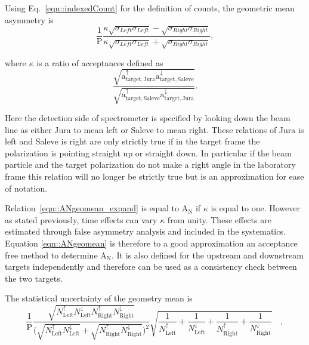 Using Eq.~\ref{eqn::indexedCount} for the definition of counts, the geometric
mean asymmetry is
\begin{equation}
  \label{eqn::ANgeomean_expand}
\frac{1}{\mathrm{P}}\frac{\kappa \sqrt{\sigma_{Left}\sigma_{Left}} -
  \sqrt{\sigma_{Right}\sigma_{Right}}}{\kappa \sqrt{\sigma_{Left}\sigma_{Left}}
  + \sqrt{\sigma_{Right}\sigma_{Right}}},
\end{equation}

\noindent
where $\kappa$ is a ratio of acceptances defined as
\begin{equation}
\frac{\sqrt{\mathrm{a}^{\uparrow}_{\mathrm{target,Jura}}
    \mathrm{a}^{\downarrow}_{\mathrm{target,Saleve}}}}
     {\sqrt{\mathrm{a}^{\uparrow}_{\mathrm{target,Saleve}}
         \mathrm{a}^{\downarrow}_{\mathrm{target,Jura}}}}.
     \label{equ::accGeoMean}
\end{equation}

\noindent
Here the detection side of spectrometer is specified by looking down the beam
line as either Jura to mean left or Saleve to mean right.  These relations of
Jura is left and Saleve is right are only strictly true if in the target frame
the polarization is pointing straight up or straight down.  In particular if the
beam particle and the target polarization do not make a right angle in the
laboratory frame this relation will no longer be strictly true but is an
approximation for ease of notation.

Relation~\ref{eqn::ANgeomean_expand} is equal to A$_{\mathrm{N}}$ if $\kappa$ is
equal to one.  However as stated previously, time effects can vary $\kappa$ from
unity. These effects are estimated through false asymmetry analysis and included
in the systematics.  Equation \ref{eqn::ANgeomean} is therefore to a good
approximation an acceptance free method to determine A$_{\mathrm{N}}$.  It is
also defined for the upstream and downstream targets independently and therefore
can be used as a consistency check between the two targets.

The statistical uncertainty of the geometry mean is
\begin{equation}
  \frac{1}{\mathrm{P}}
  \frac{
    \sqrt{
      N_{\mathrm{Left}}^{\uparrow}N_{\mathrm{Left}}^{\downarrow}
      N_{\mathrm{ Right}}^{\uparrow}N_{\mathrm{Right}}^{\downarrow}
    }
  }{
    \Big( \sqrt{N_{\mathrm{Left}}^{\uparrow}N_{\mathrm{Left}}^{\downarrow}} +
    \sqrt{N_{\mathrm{Right}}^{\uparrow}N_{\mathrm{Right}}^{\downarrow}} \Big)^2
  }
  \sqrt{
    \frac{1}{N_{\mathrm{Left}}^{\uparrow}} +
    \frac{1}{N_{\mathrm{Left}}^{\downarrow}} +
    \frac{1}{N_{\mathrm{Right}}^{\uparrow}} +
    \frac{1}{N_{\mathrm{Right}}^{\downarrow}}
  } \quad,
\end{equation}

